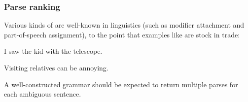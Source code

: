 \documentclass[output=paper
                ,modfonts
                ,nonflat
	        ,collection
	        ,collectionchapter
	        ,collectiontoclongg
 	        ,biblatex
                ,babelshorthands
                ,newtxmath
                ,draftmode
                ,colorlinks, citecolor=brown
]{./langsci/langscibook}
\begin{document}


\subsubsection{Parse ranking}
\label{cl:prac:rank}

Various kinds of  are well-known in linguistics
(such as modifier attachment and part-of-speech assignment),
to the point that examples like  are stock in trade:

\begin{exe}
\ex\label{cl:ambig-telescope} 
\begin{xlist}
\item I saw the kid with the telescope.
\item Visiting relatives can be annoying.
\end{xlist}
\end{exe}


\noindent
A well-constructed grammar should be expected to return multiple
parses for each ambiguous sentence.
\end{document}
